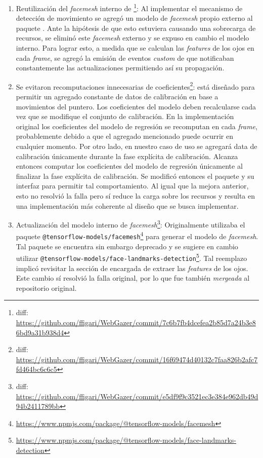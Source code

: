 \begin{enumerate}
    \item
    Reutilización del \textit{facemesh} interno de \webgazer\footnote{diff:
    \url{https://github.com/ffigari/WebGazer/commit/7c6b7fb4dcefea2b85d7a24b3e86bd9a31b938d4}}:
    Al implementar el mecanismo de detección de movimiento se agregó un modelo
    de \textit{facemesh} propio externo al paquete \webgazer.
    Ante la hipótesis de que esto estuviera causando una sobrecarga de
    recursos, se eliminó este \textit{facemesh} externo y se expuso en cambio
    el modelo interno.
    Para lograr esto, a medida que se calculan las \textit{features} de los
    ojos en cada \textit{frame}, se agregó la emisión de eventos
    \textit{custom} de \js que notificaban constantemente las actualizaciones
    permitiendo así su propagación.
    \item
    Se evitaron recomputaciones innecesarias de coeficientes\footnote{diff:
    \url{https://github.com/ffigari/WebGazer/commit/16f69474d40132c7faa826b2afc7fd464bc6c6c5}}:
    \webgazer está diseñado para permitir un agregado constante de datos de
    calibración en base a movimientos del puntero.
    Los coeficientes del modelo deben recalcularse cada vez que se modifique el
    conjunto de calibración.
    En la implementación original los coeficientes del modelo de regresión se
    recomputan en cada \textit{frame}, probablemente debido a que el agregado
    mencionado puede ocurrir en cualquier momento.
    Por otro lado, en nuestro caso de uso se agregará data de calibración
    únicamente durante la fase explícita de calibración.
    Alcanza entonces computar los coeficientes del modelo de regresión
    únicamente al finalizar la fase explícita de calibración.
    Se modificó entonces el paquete y su interfaz para permitir tal
    comportamiento.
    Al igual que la mejora anterior, esto no resolvió la falla pero sí reduce
    la carga sobre los recursos y resulta en una implementación más coherente
    al diseño que se busca implementar.
    \item
    Actualización del modelo interno de \textit{facemesh}\footnote{diff:
    \url{https://github.com/ffigari/WebGazer/commit/e5df9f9c3521ec3e384e962db49d94b2411789bb}}:
    Originalmente \webgazer utilizaba el paquete
    \texttt{@tensorflow-models/facemesh}\footnote{\url{https://www.npmjs.com/package/@tensorflow-models/facemesh}}
    para generar el modelo de \textit{facemesh}.
    Tal paquete se encuentra sin embargo deprecado y se sugiere en cambio
    utilizar
    \texttt{@tensorflow-models/face-landmarks-detection}\footnote{\url{https://www.npmjs.com/package/@tensorflow-models/face-landmarks-detection}}.
    Tal reemplazo implicó revisitar la sección de \webgazer encargada de
    extraer las \textit{features} de los ojos.
    Este cambio sí resolvió la falla original, por lo que fue también
    \textit{mergeada} al repositorio original.
\end{enumerate}

